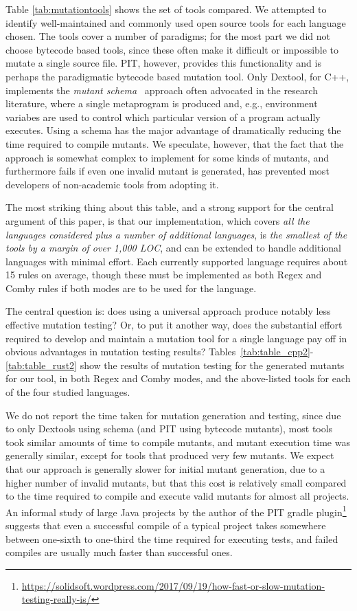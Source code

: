 \documentclass[sigconf,review, anonymous]{acmart}
\begin{document}
Table \ref{tab:mutationtools} shows the set of tools compared.  We
attempted to identify well-maintained and commonly used open
source tools for each
language chosen.  The tools cover a number of paradigms; for the most
part we did not choose bytecode based tools, since these often make it
difficult or impossible to mutate a single source file.  PIT, however,
provides this functionality and is perhaps the paradigmatic bytecode
based mutation tool.  Only Dextool, for C++, implements the
\emph{mutant schema}~\cite{untch1993mutation} approach often advocated
in the research literature, where a single metaprogram is produced
and, e.g., environment variabes are used to control which particular
version of a program actually executes.  Using a schema has the major
advantage of dramatically reducing the time required to compile
mutants.  We speculate, however, that the fact that the approach is
somewhat complex to implement for some kinds of mutants, and
furthermore fails if even one invalid mutant is generated, has
prevented most developers of non-academic tools from adopting it.

The most striking thing about this table, and a strong support for
the central argument of this paper, is that our implementation, which
covers \emph{all the languages considered plus a number of additional
languages}, is \emph{the smallest of the tools by a margin of over 1,000 LOC},
and can be extended to handle additional languages with minimal
effort.  Each currently supported language requires about 15 rules on
average, though these must be implemented as both Regex and Comby
rules if both modes are to be used for the language.

The central question is: does using a universal approach produce
notably less effective mutation testing?  Or, to put it another way,
does the substantial effort required to develop and maintain a
mutation tool for a single language pay off in obvious advantages in
mutation testing results?
Tables~\ref{tab:table_cpp2}-\ref{tab:table_rust2} show the results of
mutation testing for the generated mutants for our tool, in both Regex
and Comby modes, and the above-listed tools for each of the four
studied languages.

We do not report the time taken for mutation generation and testing,
since due to only Dextools using schema (and PIT using bytecode mutants), most tools took similar
amounts of time to compile mutants, and mutant execution time was
generally similar, except for tools that produced very few mutants.
We expect that our approach is generally slower for initial mutant
generation, due to a higher number of invalid mutants, but that this
cost is relatively small compared to the time required to compile and
execute valid mutants for almost all projects.  An informal study of
large Java projects by the author of the PIT gradle
plugin\footnote{\url{https://solidsoft.wordpress.com/2017/09/19/how-fast-or-slow-mutation-testing-really-is/}}
  suggests that even a successful compile of a typical project takes
  somewhere between one-sixth to one-third the time required for
  executing tests, and failed compiles are usually much
  faster than successful ones.
\end{document}
